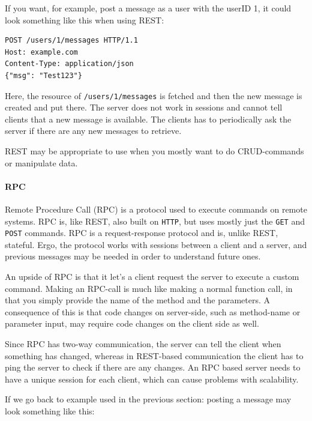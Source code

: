 \documentclass{article}
\begin{document}
If you want, for example, post a message as a user with the userID 1, it
could look something like this when using REST:

\begin{lstlisting}
POST /users/1/messages HTTP/1.1
Host: example.com
Content-Type: application/json
{"msg": "Test123"}
\end{lstlisting}

Here, the resource of \texttt{/users/1/messages} is fetched and then the
new message is created and put there. The server does not work in
sessions and cannot tell clients that a new message is available. The
clients has to periodically ask the server if there are any new messages
to retrieve.

REST may be appropriate to use when you mostly want to do CRUD-commands
or manipulate data.

\paragraph{RPC}

Remote Procedure Call (RPC) is a protocol used to execute commands on remote systems. RPC is, like REST, also
built on \texttt{HTTP}, but uses mostly just the \texttt{GET} and \texttt{POST} commands. RPC is a request-response protocol and is, unlike
REST, stateful. Ergo, the protocol works with sessions between a client and a server, and previous messages may
be needed in order to understand future ones.

An upside of RPC is that it let's a client request the server to execute
a custom command. Making an RPC-call is much like making a normal
function call, in that you simply provide the name of the method and the
parameters. A consequence of this is that code changes on server-side,
such as method-name or parameter input, may require code changes on the
client side as well.

Since RPC has two-way communication, the server can tell the client when
something has changed, whereas in REST-based communication the client
has to ping the server to check if there are any changes. An RPC based
server needs to have a unique session for each client, which can cause
problems with scalability.

If we go back to example used in the previous section: posting a message
may look something like this:
\end{document}
